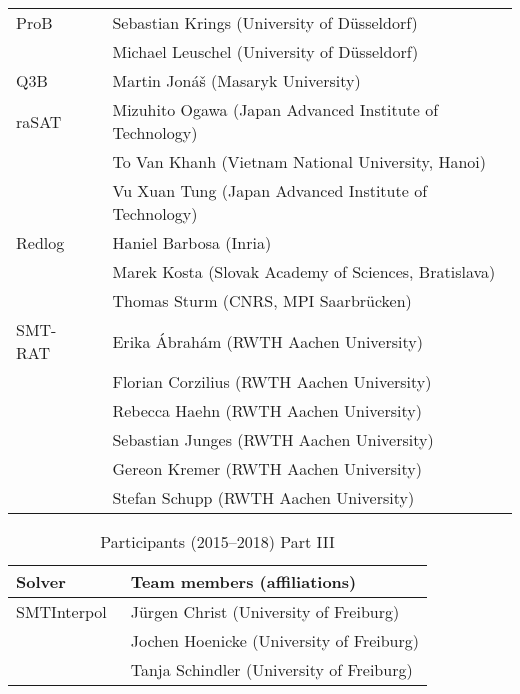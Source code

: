 {\begin{table}
\begin{tabular}{ll}
      ProB~\cite{doi:10.1002/9781119002727.ch14}
      & Sebastian Krings (University of D\"usseldorf) \\
      & Michael Leuschel (University of D\"usseldorf)
      \\ \midrule

      Q3B
      & Martin Jon\'a\v{s} (Masaryk University)
      \\ \midrule

      raSAT~\cite{rasat}
      & Mizuhito Ogawa (Japan Advanced Institute of Technology) \\
      & To Van Khanh (Vietnam National University, Hanoi) \\
      & Vu Xuan Tung (Japan Advanced Institute of Technology)
      \\ \midrule

      Redlog~\cite{DBLP:journals/cca/Dolzmann097}
      & Haniel Barbosa (Inria) \\
      & Marek Kosta (Slovak Academy of Sciences, Bratislava)  \\
      & Thomas Sturm (CNRS, MPI Saarbr\"ucken)
      \\ \midrule

      SMT-RAT~\cite{DBLP:conf/sat/CorziliusKJSA15}
      & Erika \'Abrah\'am (RWTH Aachen University) \\
      & Florian Corzilius (RWTH Aachen University) \\
      & Rebecca Haehn (RWTH Aachen University) \\
      & Sebastian Junges (RWTH Aachen University) \\
      & Gereon Kremer (RWTH Aachen University) \\
      & Stefan Schupp (RWTH Aachen University)
      \\ \bottomrule
    \end{tabular}
  \end{table}

  \begin{table}
    \centering
    \caption{Participants (2015--2018) Part III}
    \label{table:participants3}
    \begin{tabular}{ll}
      \toprule
      Solver & Team members (affiliations)\\
      \midrule \midrule

      SMTInterpol~\cite{DBLP:conf/spin/ChristHN12}
      & J\"urgen Christ (University of Freiburg) \\
      & Jochen Hoenicke (University of Freiburg) \\
      & Tanja Schindler (University of Freiburg)
      \\ \midrule


\end{tabular}
\end{table}}
